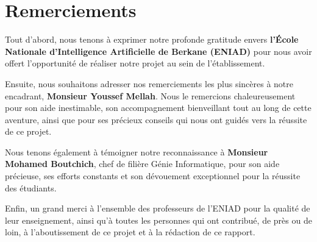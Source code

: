 \chapter*{Remerciements}

Tout d'abord, nous tenons à exprimer notre profonde gratitude envers \textbf{l'École Nationale d'Intelligence Artificielle de Berkane (ENIAD)} pour nous avoir offert l'opportunité de réaliser notre projet au sein de l'établissement.

Ensuite, nous souhaitons adresser nos remerciements les plus sincères à notre encadrant, \textbf{Monsieur Youssef Mellah}. Nous le remercions chaleureusement pour son aide inestimable, son accompagnement bienveillant tout au long de cette aventure, ainsi que pour ses précieux conseils qui nous ont guidés vers la réussite de ce projet.

Nous tenons également à témoigner notre reconnaissance à \textbf{Monsieur Mohamed Boutchich}, chef de filière Génie Informatique, pour son aide précieuse, ses efforts constants et son dévouement exceptionnel pour la réussite des étudiants.

Enfin, un grand merci à l'ensemble des professeurs de l'ENIAD pour la qualité de leur enseignement, ainsi qu'à toutes les personnes qui ont contribué, de près ou de loin, à l'aboutissement de ce projet et à la rédaction de ce rapport.